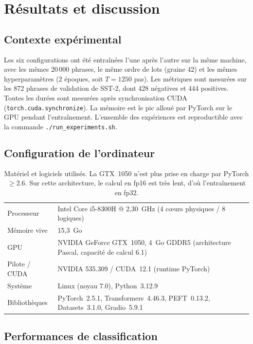 \section{Résultats et discussion}\label{sec:res}
\subsection{Contexte expérimental}
Les six configurations ont été entraînées l'une après l'autre sur la même machine, avec les mêmes 20\,000 phrases, le même ordre de lots (graine 42) et les mêmes hyperparamètres (2 époques, soit $T=1250$ pas). Les métriques sont mesurées sur les 872 phrases de validation de SST-2, dont 428 négatives et 444 positives. Toutes les durées sont mesurées après synchronisation CUDA (\texttt{torch.cuda.synchronize}). La mémoire est le pic alloué par PyTorch sur le GPU pendant l'entraînement. L'ensemble des expériences est reproductible avec la commande \texttt{./run\_experiments.sh}.

\subsection{Configuration de l'ordinateur}
\begin{table}[H]\centering\small
\begin{tabular}{ll}\toprule
Processeur & Intel Core i5-8300H @ 2,30~GHz (4 cœurs physiques / 8 logiques)\\
Mémoire vive & 15,3~Go\\
GPU & NVIDIA GeForce GTX~1050, 4~Go GDDR5 (architecture Pascal, capacité de calcul 6.1)\\
Pilote / CUDA & NVIDIA 535.309 / CUDA~12.1 (runtime PyTorch)\\
Système & Linux (noyau 7.0), Python~3.12.9\\
Bibliothèques & PyTorch~2.5.1, Transformers~4.46.3, PEFT~0.13.2, Datasets~3.1.0, Gradio~5.9.1\\
\bottomrule\end{tabular}
\caption{Matériel et logiciels utilisés. La GTX~1050 n'est plus prise en charge par PyTorch $\geq2.6$. Sur cette architecture, le calcul en fp16 est très lent, d'où l'entraînement en fp32.}
\end{table}

\subsection{Performances de classification}
\begin{table}[H]\centering
\resizebox{\textwidth}{!}{}
\caption{Synthèse des six expériences. « \% » : part des paramètres entraînés. Acc. et F1 en \% sur la validation SST-2. Éch./s : débit d'entraînement. GPU : pic mémoire à l'entraînement. Disque : taille du checkpoint sauvegardé.}
\label{tab:res}
\end{table}

